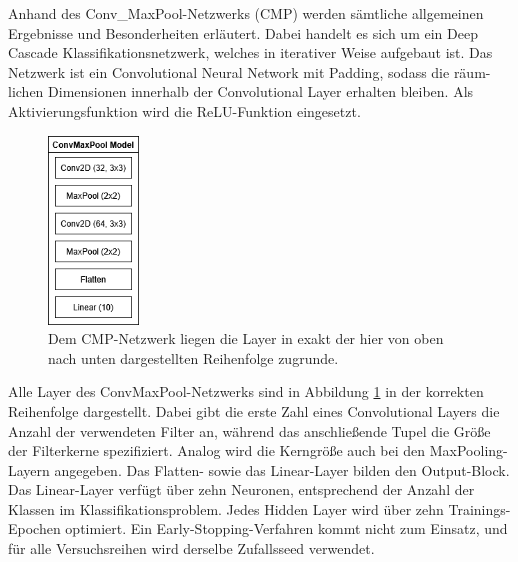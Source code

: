 Anhand des Conv\_MaxPool-Netzwerks (CMP) werden sämtliche allgemeinen Ergebnisse und Besonderheiten erläutert. Dabei handelt es sich um ein Deep 
Cascade Klassifikationsnetzwerk, welches in iterativer Weise aufgebaut ist. Das Netzwerk ist ein Convolutional Neural Network mit Padding, 
sodass die räum-lichen Dimensionen innerhalb der Convolutional Layer erhalten bleiben. Als Aktivierungsfunktion wird die ReLU-Funktion 
eingesetzt.

\begin{figure}[htpb]
    \centering
    \includegraphics[height=5cm]{../../Graphiken/convmaxpool.png}
    \caption{\label{fig:convmaxpool} 
    \small{Dem CMP-Netzwerk liegen die Layer in exakt der hier von oben nach unten dargestellten Reihenfolge zugrunde.}}
\end{figure}

Alle Layer des ConvMaxPool-Netzwerks sind in Abbildung \ref{fig:convmaxpool} in der korrekten Reihenfolge dargestellt. Dabei gibt die erste 
Zahl eines Convolutional Layers die Anzahl der verwendeten Filter an, während das anschließende Tupel die Größe der Filterkerne spezifiziert. 
Analog wird die Kerngröße auch bei den MaxPooling-Layern angegeben. Das Flatten- sowie das Linear-Layer bilden den Output-Block. Das 
Linear-Layer verfügt über zehn Neuronen, entsprechend der Anzahl der Klassen im Klassifikationsproblem. Jedes Hidden Layer wird über zehn 
Trainings-Epochen optimiert. Ein Early-Stopping-Verfahren kommt nicht zum Einsatz, und für alle Versuchsreihen wird derselbe Zufallsseed 
verwendet.
